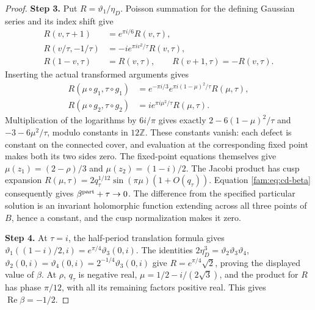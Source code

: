 \begin{proof}
\noindent\textbf{Step 3.} Put \(R=\vartheta_1/\eta_D\). Poisson summation for the defining Gaussian
series and its index shift give
\[
 \begin{aligned}
 R(v,\tau+1)&=e^{\pi i/6}R(v,\tau),\\
 R(v/\tau,-1/\tau)&=-i e^{\pi iv^2/\tau}R(v,\tau),\\
 R(1-v,\tau)&=R(v,\tau),\qquad R(v+1,\tau)=-R(v,\tau).
 \end{aligned}
\]
Inserting the actual transformed arguments gives
\[
 \begin{aligned}
 R(\mu\circ g_1,\tau\circ g_1)
 &=e^{-\pi i/3}e^{\pi i(1-\mu)^2/\tau}R(\mu,\tau),\\
 R(\mu\circ g_2,\tau\circ g_2)
 &=i e^{\pi i\mu^2/\tau}R(\mu,\tau).
 \end{aligned}
\]
Multiplication of the logarithms by \(6i/\pi\) gives exactly
\(2-6(1-\mu)^2/\tau\) and \(-3-6\mu^2/\tau\), modulo constants in
\(12\mathbb Z\). These constants vanish: each defect is constant on the
connected cover, and evaluation at the corresponding fixed point makes
both its two sides zero. The fixed-point equations themselves give
\(\mu(z_1)=(2-\rho)/3\) and \(\mu(z_2)=(1-i)/2\).
The Jacobi product has cusp expansion
\(R(\mu,\tau)=2q_\tau^{1/12}\sin(\pi\mu)(1+O(q_\tau))\).
Equation \eqref{fam:eq:cd-beta} consequently gives
\(\beta^{\rm part}+\tau\to0\). The difference from the specified particular
solution is an invariant holomorphic function extending across all three
points of \(B\), hence a constant, and the cusp normalization makes it zero.


\noindent\textbf{Step 4.} At \(\tau=i\), the half-period translation formula gives
\(\vartheta_1((1-i)/2,i)=e^{\pi/4}\vartheta_3(0,i)\).
The identities \(2\eta_D^3=\vartheta_2\vartheta_3\vartheta_4\),
\(\vartheta_2(0,i)=\vartheta_4(0,i)=2^{-1/4}\vartheta_3(0,i)\)
give \(R=e^{\pi/4}\sqrt2\), proving the displayed value of \(\beta\).
At \(\rho\), \(q_\tau\) is negative real, \(\mu=1/2-i/(2\sqrt3)\), and the
product for \(R\) has phase \(\pi/12\), with all its remaining factors
positive real. This gives \(\operatorname{Re}\beta=-1/2\).
\end{proof}

